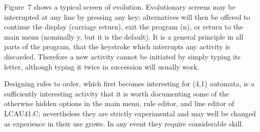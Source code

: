 Figure~7 shows a typical screen of evolution. Evolutionary screens may 
be interrupted at any line by pressing any key; alternatives will then 
be offered to continue the display (carriage return), exit the program 
(n), or return to the main menu (nominally y, but it is the default). 
It is a general principle in all parts of the program, that the 
keystroke which interrupts any activity is discarded. Therefore a new 
activity cannot be initiated by simply typing its letter, although 
typing it twice in succession will usually work. 

Designing rules to order, which first becomes interesting for (4,1) 
automata, is a sufficiently interesting activity that it is worth 
documenting some of the otherwise hidden options in the main menu, rule 
editor, and line editor of LCAU41.C; nevertheless they are strictly 
experimental and may well be changed as experience in their use grows. 
In any event they require considerable skill. 

